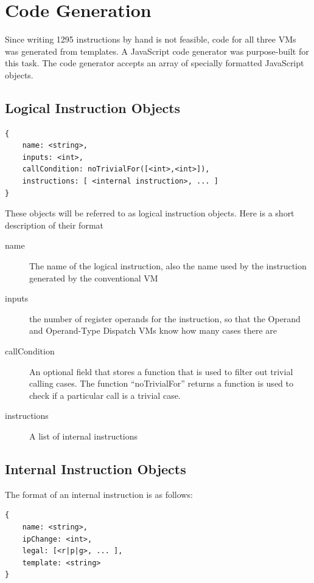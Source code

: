 \documentclass[english,a4paper,12pt]{report}
\begin{document}
\section{Code Generation}

Since writing 1295 instructions by hand is not feasible, code for all
three VMs was generated from templates. A JavaScript code generator
was purpose-built for this task. The code generator accepts an array
of specially formatted JavaScript objects.

\subsection{Logical Instruction Objects}

\begin{lstlisting}
{
    name: <string>,
    inputs: <int>,
    callCondition: noTrivialFor([<int>,<int>]),
    instructions: [ <internal instruction>, ... ]
}	
\end{lstlisting}
These objects will be referred to as logical instruction objects. Here
is a short description of their format
\begin{description}
\item[name] The name of the logical instruction, also the name used by
  the instruction generated by the conventional VM
\item[inputs] the number of register operands for the instruction, so
  that the Operand and Operand-Type Dispatch VMs know how many cases
  there are
\item[callCondition] An optional field that stores a function that is
  used to filter out trivial calling cases. The function
  ``noTrivialFor'' returns a function is used to check if a particular
  call is a trivial case.
	\item[instructions] A list of internal instructions	
\end{description}

\subsection{Internal Instruction Objects}

The format of an internal instruction is as follows:
\begin{lstlisting}
{
    name: <string>,
    ipChange: <int>,
    legal: [<r|p|g>, ... ],
    template: <string>
}
\end{lstlisting}
\end{document}
